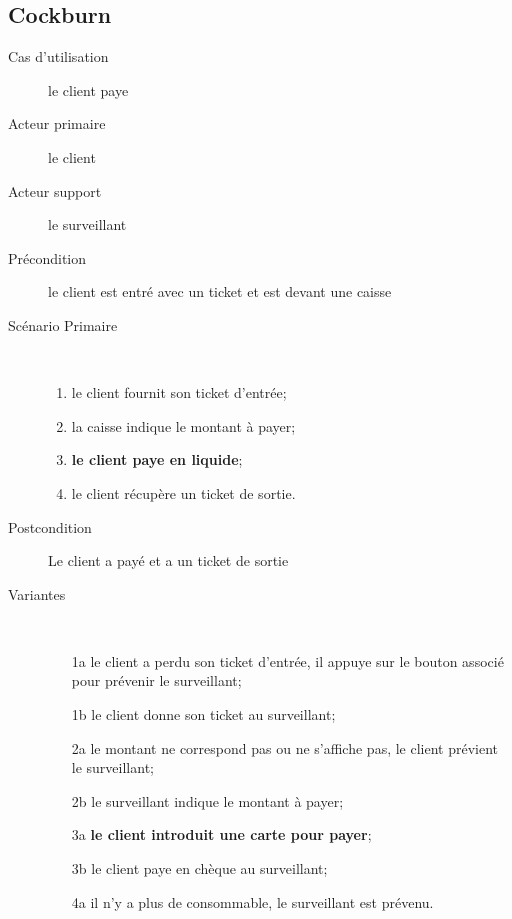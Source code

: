 \documentclass[a4paper]{article}
\begin{document}
\subsection{Cockburn}
\begin{description}
	\item[Cas d'utilisation] le client paye
	\item[Acteur primaire] le client
	\item[Acteur support] le surveillant
	\item[Pr\'econdition] le client est entr\'e avec un ticket et est devant une caisse
	\item[Sc\'enario Primaire] \
	\begin{enumerate}
		\item le client fournit son ticket d'entr\'ee;
		\item la caisse indique le montant \`a payer;
		\item \textbf{le client paye en liquide};
		\item le client r\'ecup\`ere un ticket de sortie.
	\end{enumerate}
	\item[Postcondition] Le client a pay\'e et a un ticket de sortie
	\item[Variantes] \
	\begin{enumerate}
		\item[1a] le client a perdu son ticket d'entr\'ee, il appuye sur le
			bouton associ\'e pour pr\'evenir le surveillant;
		\item[1b] le client donne son ticket au surveillant;
		\item[2a] le montant ne correspond pas ou ne s'affiche pas, le client
			pr\'evient le surveillant;
		\item[2b] le surveillant indique le montant \`a payer;
		\item[3a] \textbf{le client introduit une carte pour payer};
		\item[3b] le client paye en ch\`eque au surveillant;
		\item[4a] il n'y a plus de consommable, le surveillant est pr\'evenu.
	\end{enumerate}
\end{description}
\end{document}
